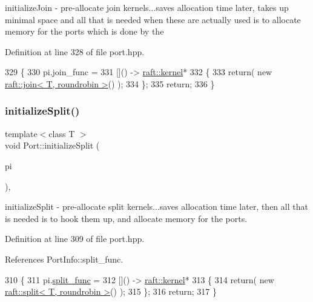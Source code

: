 initialize\+Join -\/ pre-\/allocate join kernels...saves allocation time later, takes up minimal space and all that is needed when these are actually used is to allocate memory for the ports which is done by the 

Definition at line 328 of file port.\+hpp.


\begin{DoxyCode}
329    \{
330       pi.join\_func =
331          []() -> \hyperlink{classraft_1_1kernel}{raft::kernel}*
332          \{
333             \textcolor{keywordflow}{return}(  \textcolor{keyword}{new} \hyperlink{classraft_1_1join}{raft::join< T, roundrobin >}() );
334          \};
335       \textcolor{keywordflow}{return};
336    \}
\end{DoxyCode}
\hypertarget{class_port_a7189f6823a0d240396210a7c317d4803}{}\label{class_port_a7189f6823a0d240396210a7c317d4803} 
\subsubsection{\texorpdfstring{initialize\+Split()}{initializeSplit()}}
{\footnotesize\ttfamily template$<$class T $>$ \\
void Port\+::initialize\+Split (\begin{DoxyParamCaption}\item[{\hyperlink{struct_port_info}{Port\+Info} \&}]{pi }\end{DoxyParamCaption})\hspace{0.3cm}{\ttfamily [inline]}, {\ttfamily [protected]}}

initialize\+Split -\/ pre-\/allocate split kernels...saves allocation time later, then all that is needed is to hook them up, and allocate memory for the ports. 

Definition at line 309 of file port.\+hpp.



References Port\+Info\+::split\+\_\+func.


\begin{DoxyCode}
310    \{
311       pi.\hyperlink{struct_port_info_a6b7e8758b84288a4378233251252be77}{split\_func} =
312          []() -> \hyperlink{classraft_1_1kernel}{raft::kernel}*
313          \{
314             \textcolor{keywordflow}{return}(  \textcolor{keyword}{new} \hyperlink{classraft_1_1split}{raft::split< T, roundrobin >}()  );
315          \};
316       \textcolor{keywordflow}{return};
317    \}
\end{DoxyCode}
\hypertarget{class_port_a08cf165426982d83e5a191ba74cc6e5d}{}\label{class_port_a08cf165426982d83e5a191ba74cc6e5d} 
